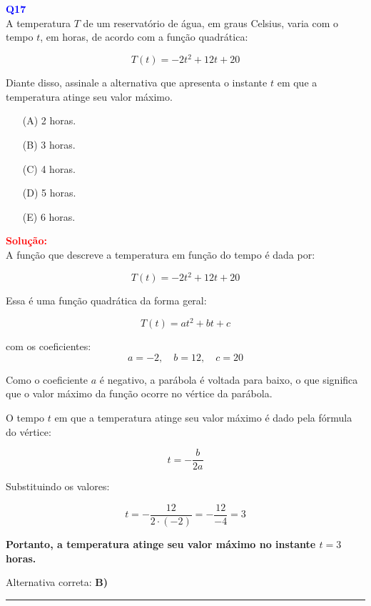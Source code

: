 \documentclass[a4paper,12pt]{article}
\begin{document}
\begin{flushleft}
\textbf{\textcolor{blue}{\Large Q17}}\\
A temperatura \( T \) de um reservatório de água, em graus Celsius, varia com o tempo \( t \), em horas, de acordo com a função quadrática:

\[
T(t) = -2t^2 + 12t + 20
\]

Diante disso, assinale a alternativa que apresenta o instante \( t \) em que a temperatura atinge seu valor máximo.
\begin{itemize}
\item[(A)] 2 horas.
\item[(B)] 3 horas.
\item[(C)] 4 horas.
\item[(D)] 5 horas.
\item[(E)] 6 horas.
\end{itemize}

\vspace{0.5cm}

\textcolor{red}{\textbf{Solução:}}\\

A função que descreve a temperatura em função do tempo é dada por:

\[
T(t) = -2t^2 + 12t + 20
\]

Essa é uma função quadrática da forma geral:

\[
T(t) = at^2 + bt + c
\]

com os coeficientes:
\[
a = -2, \quad b = 12, \quad c = 20
\]

Como o coeficiente \( a \) é negativo, a parábola é voltada para baixo, o que significa que o valor máximo da função ocorre no vértice da parábola.

O tempo \( t \) em que a temperatura atinge seu valor máximo é dado pela fórmula do vértice:

\[
t = -\frac{b}{2a}
\]

Substituindo os valores:

\[
t = -\frac{12}{2 \cdot (-2)} = -\frac{12}{-4} = 3
\]

\textbf{Portanto, a temperatura atinge seu valor máximo no instante \( t = 3 \) horas.}

Alternativa correta: \colorbox{green!50}{\textbf{B)}}

\end{flushleft}

\noindent\rule{\linewidth}{0.6pt}\\
\end{document}
